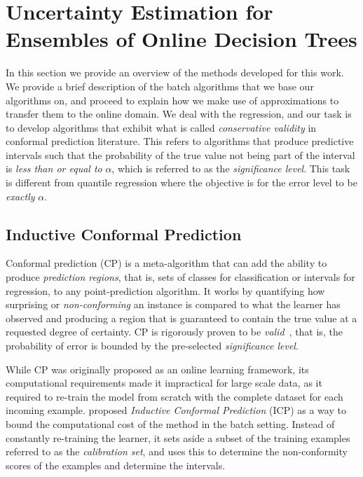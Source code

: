 \section{Uncertainty Estimation for Ensembles of Online Decision Trees}
\label{sec:uncertain-trees-method}

In this section we provide an overview of the methods developed for this work.
We provide a brief description of the batch algorithms that we base our algorithms
on, and proceed to explain how we make use of approximations to transfer them to
the online domain. We deal with the regression, and our task is to develop algorithms
that exhibit what is called \emph{conservative validity} in conformal prediction literature. This refers
to algorithms that produce predictive intervals such that the probability of the true value not
being part of the interval is \emph{less than or equal to} $\alpha$, which is referred
to as the \emph{significance level}. This task is different from quantile regression \cite{koenker2005qr}
where the objective is for the error level to be \emph{exactly} $\alpha$.

\subsection{Inductive Conformal Prediction}

Conformal prediction (CP) is a meta-algorithm that can add the ability to
produce \emph{prediction regions}, that is, sets of classes for classification or
intervals for regression, to any point-prediction algorithm. It works by
quantifying how surprising or \emph{non-conforming} an instance is compared
to what the learner has observed and producing a region that is guaranteed
to contain the true value at a requested degree of certainty. CP is rigorously
proven to be \textit{valid}~\cite{vovk2005algorithmic}, that is, the probability of error is bounded
by the pre-selected \emph{significance level}.

While CP was originally proposed as an online learning framework, its computational
requirements made it impractical for large scale data, as it required to re-train
the model from scratch with the complete dataset for each incoming example.
\citet{papadopoulos2002icp} proposed \emph{Inductive Conformal Prediction} (ICP) as
a way to bound the computational cost of the method in the batch setting.
Instead of constantly re-training the learner, it sets aside a subset
of the training examples referred to as the \emph{calibration set},
and uses this to determine the non-conformity scores of the examples
and determine the intervals.


